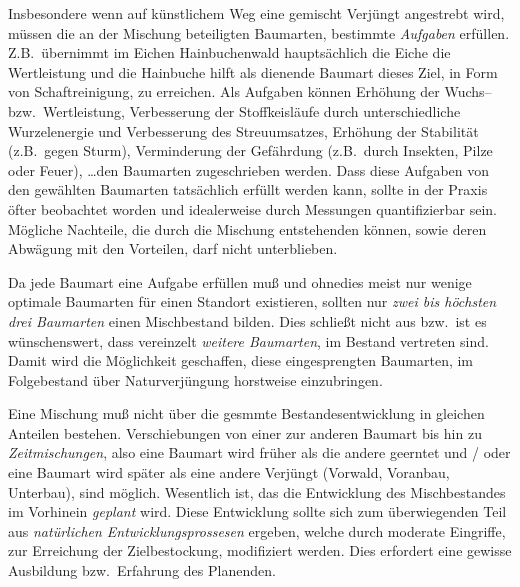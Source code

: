 \documentclass[twocolumn]{scrartcl}
\begin{document}
Insbesondere wenn auf künstlichem Weg eine gemischt Verjüngt
angestrebt wird, müssen die an der Mischung beteiligten Baumarten,
bestimmte \emph{Aufgaben} erfüllen. Z.B.\ übernimmt im Eichen
Hainbuchenwald hauptsächlich die Eiche die Wertleistung und die
Hainbuche hilft als dienende Baumart dieses Ziel, in Form von
Schaftreinigung, zu erreichen. Als Aufgaben können Erhöhung der
Wuchs-- bzw.\ Wertleistung, Verbesserung der Stoffkeisläufe durch
unterschiedliche Wurzelenergie und Verbesserung des Streuumsatzes,
Erhöhung der Stabilität (z.B.\ gegen Sturm), Verminderung der
Gefährdung (z.B.\ durch Insekten, Pilze oder Feuer), \dots den
Baumarten zugeschrieben werden. Dass diese Aufgaben von den gewählten
Baumarten tatsächlich erfüllt werden kann, sollte in der Praxis öfter
beobachtet worden und idealerweise durch Messungen quantifizierbar
sein. Mögliche Nachteile, die durch die Mischung entstehenden können,
sowie deren Abwägung mit den Vorteilen, darf nicht unterblieben.

Da jede Baumart eine Aufgabe erfüllen muß und ohnedies meist nur
wenige optimale Baumarten für einen Standort existieren, sollten nur
\emph{zwei bis höchsten drei Baumarten} einen Mischbestand
bilden. Dies schließt nicht aus bzw.\ ist es wünschenswert, dass
vereinzelt \emph{weitere Baumarten}, im Bestand vertreten sind. Damit
wird die Möglichkeit geschaffen, diese eingesprengten Baumarten, im
Folgebestand über Naturverjüngung horstweise einzubringen.

Eine Mischung muß nicht über die gesmmte Bestandesentwicklung in
gleichen Anteilen bestehen. Verschiebungen von einer zur anderen
Baumart bis hin zu \emph{Zeitmischungen}, also eine Baumart wird
früher als die andere geerntet und / oder eine Baumart wird später als
eine andere Verjüngt (Vorwald, Voranbau, Unterbau), sind
möglich. Wesentlich ist, das die Entwicklung des Mischbestandes im
Vorhinein \emph{geplant} wird. Diese Entwicklung sollte sich zum
überwiegenden Teil aus \emph{natürlichen Entwicklungsprossesen}
ergeben, welche durch moderate Eingriffe, zur Erreichung der
Zielbestockung, modifiziert werden. Dies erfordert eine gewisse
Ausbildung bzw.\ Erfahrung des Planenden.
\end{document}
